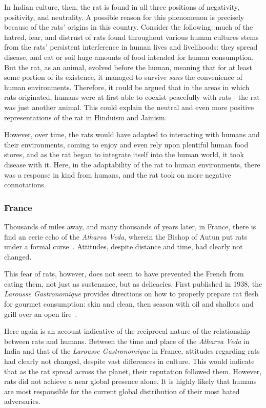 \documentclass[12pt]{article}
\begin{document}
In Indian culture, then, the rat is found in all three positions of negativity, positivity, and neutrality. A possible reason for this phenomenon is precisely because of the rats' origins in this country. Consider the following: much of the hatred, fear, and distrust of rats found throughout various human cultures stems from the rats' persistent interference in human lives and livelihoods: they spread disease, and eat or soil huge amounts of food intended for human consumption. But the rat, as an animal, evolved before the human, meaning that for at least some portion of its existence, it managed to survive \textit{sans} the convenience of human environments. Therefore, it could be argued that in the areas in which rats originated, humans were at first able to coexist peacefully with rats - the rat was just another animal. This could explain the neutral and even more positive representations of the rat in Hinduism and Jainism.

However, over time, the rats would have adapted to interacting with humans and their environments, coming to enjoy and even rely upon plentiful human food stores, and as the rat began to integrate itself into the human world, it took disease with it. Here, in the adaptability of the rat to human environments, there was a response in kind from humans, and the rat took on more negative connotations.

\subsubsection{France} \label{France}

Thousands of miles away, and many thousands of years later, in France, there is find an eerie echo of the \textit{Atharva Veda}, wherein the Bishop of Autun put rats under a formal curse~\cite{Barnett2001}. Attitudes, despite distance and time, had clearly not changed.

This fear of rats, however, does not seem to have prevented the French from eating them, not just as sustenance, but as delicacies. First published in 1938, the \textit{Larousse Gastronomique} provides directions on how to properly prepare rat flesh for gourmet consumption: skin and clean, then season with oil and shallots and grill over an open fire~\cite{Barnett2001}.

Here again is an account indicative of the reciprocal nature of the relationship between rats and humans. Between the time and place of the \textit{Atharva Veda} in India and that of the \textit{Larousse Gastronomique} in France, attitudes regarding rats had clearly not changed, despite vast differences in culture. This would indicate that as the rat spread across the planet, their reputation followed them. However, rats did not achieve a near global presence alone. It is highly likely that humans are most responsible for the current global distribution of their most hated adversaries.
\end{document}
